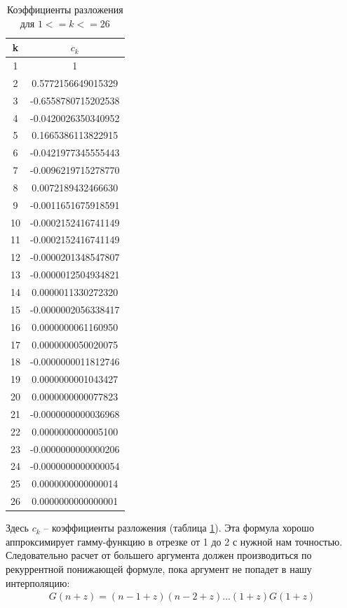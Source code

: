 \documentclass[a4paper,14pt]{extarticle}
\begin{document}
\begin{table}[H]
	\centering
	\begin{tabular}{|c|c|}
		\hline
		k & $c_k$ \\
		\hline
		1 & 1 \\
		\hline
		2 & 0.5772156649015329 \\
		\hline
		3 & -0.6558780715202538 \\
		\hline
		4 & -0.0420026350340952 \\
		\hline
		5 & 0.1665386113822915 \\
		\hline
		6 & -0.0421977345555443 \\
		\hline
		7 & -0.0096219715278770 \\
		\hline
		8 & 0.0072189432466630\\
		\hline
		9 & -0.0011651675918591 \\
		\hline
		10 & -0.0002152416741149 \\
		\hline
		11 & -0.0002152416741149 \\
		\hline
		12 & -0.0000201348547807 \\
		\hline
		13 & -0.0000012504934821 \\
		\hline
		14 & 0.0000011330272320 \\
		\hline
		15 & -0.0000002056338417 \\
		\hline
		16 & 0.0000000061160950 \\
		\hline
		17 & 0.0000000050020075 \\
		\hline
		18 & -0.0000000011812746 \\
		\hline
		19 & 0.0000000001043427 \\
		\hline
		20 & 0.0000000000077823 \\
		\hline
		21 & -0.0000000000036968 \\
		\hline
		22 & 0.0000000000005100 \\
		\hline
		23 & -0.0000000000000206 \\
		\hline
		24 & -0.0000000000000054 \\
		\hline
		25 & 0.0000000000000014 \\
		\hline
		26 & 0.0000000000000001 \\
		\hline
	\end{tabular}
\caption{Коэффициенты разложения для $1 <= k <= 26$}
\label{table_1}
\end{table}


Здесь $c_k$ -- коэффициенты разложения (таблица \ref{table_1}). 
Эта формула хорошо аппроксимирует гамму-функцию в отрезке от 1 до 2 с нужной нам точностью. 
Следовательно расчет от большего аргумента должен производиться по рекуррентной понижающей формуле, пока аргумент не попадет в нашу интерполяцию:
\begin{align*}
	G(n+z) = (n - 1 + z)(n - 2 + z) ... (1 + z) G (1 + z)
\end{align*}
\end{document}
